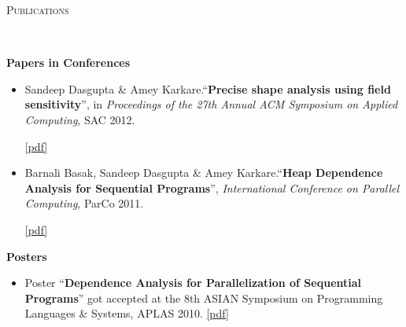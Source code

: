 \documentclass[9pt]{article}
\newenvironment{changemargin}[2]{%
  \begin{list}{}{%
    \setlength{\topsep}{0pt}%
    \setlength{\leftmargin}{#1}%
    \setlength{\rightmargin}{#2}%
    \setlength{\listparindent}{\parindent}%
    \setlength{\itemindent}{\parindent}%
    \setlength{\parsep}{\parskip}%
  }%
  \item[]}{\end{list}
}
\newcommand{\lineover}{
	\begin{changemargin}{-0.05in}{-0.05in}
		\vspace*{-8pt}
		\hrulefill \\
		\vspace*{-2pt}
	\end{changemargin}
}
\newcommand{\header}[1]{
	\begin{changemargin}{-0.5in}{-0.5in}
		\scshape{#1}\\
  	\lineover
	\end{changemargin}
}
\newcommand{\cmnt}[1]{}
\newenvironment{body} {
	\vspace*{-16pt}
	\begin{changemargin}{-0.25in}{-0.5in}
  }	
	{\end{changemargin}
}
\begin{document}
\smallskip

\header{Publications}
\begin{body}
\vspace{14pt}
\textbf{Papers in Conferences}\\
	\vspace*{-4pt}
	\begin{itemize} \itemsep -0pt
		\item Sandeep Dasgupta \& Amey Karkare.``\textbf{Precise shape analysis using field sensitivity}'', in \emph{Proceedings of the 27th Annual ACM Symposium on Applied Computing}, SAC 2012. 
                \cmnt{ \href{http://dx.doi.org/10.1145/2245276.2231982}{doi: 10.1145/2231936.2231982}. }
                \href{https://dl.dropbox.com/u/86719354/sac\_2012.pdf}{[pdf]}\\

		\item Barnali Basak, Sandeep Dasgupta \& Amey Karkare.``\textbf{Heap Dependence Analysis for Sequential Programs}'', \emph{International Conference on Parallel Computing}, ParCo 2011. 
                \cmnt{ \href{http://dx.doi.org/10.3233/978-1-61499-041-3-99}{doi: 10.3233/978-1-61499-041-3-99}.  }
                \href{https://dl.dropbox.com/u/86719354/parco\_2011.pdf}{[pdf]} \\
                  \cmnt{
		\begin{itemize} \itemsep -0pt
			\item Published in: Applications, Tools and Techniques on the Road to Exascale Computing, 22 volume of Advances in 
				Parallel Computing, chapter: Heap Dependence Analysis for Sequential Programs, pages 99--106. IOS Press, May 2012. 
				doi: \href{http://dx.doi.org/10.3233/978-1-61499-041-3-99}{10.3233/978-1-61499-041-3-99}, isbn: 978-1-61499-040-6.
		\end{itemize}
                  }
	\end{itemize}

\textbf{Posters}\\
	\vspace*{-4pt}
	\begin{itemize} \itemsep -0pt
		\item Poster ``\textbf{Dependence Analysis for Parallelization 
		of Sequential Programs}'' got accepted at the 8th ASIAN Symposium on Programming Languages \& Systems, APLAS 2010. \href{https://dl.dropbox.com/u/86719354/poster_APLAS2010.pdf}{[pdf]}
	\end{itemize}


\end{body}
\end{document}
